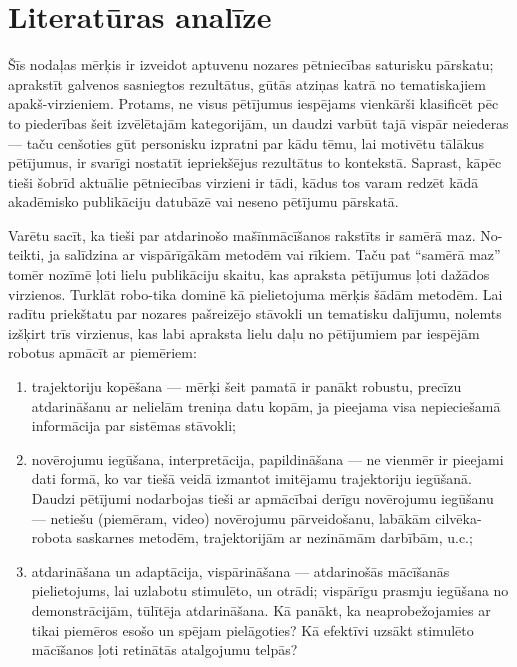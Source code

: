 \documentclass[12pt, a4paper]{article}
\numberwithin{equation}{section} %
\begin{document}
\newpage
\section{Literatūras analīze}

Šīs nodaļas mērķis ir izveidot aptuvenu nozares pētniecības saturisku pārskatu; aprakstīt galvenos sasniegtos rezultātus, gūtās atziņas katrā no tematiskajiem apakš-virzieniem. Protams, ne visus pētījumus iespējams vienkārši klasificēt pēc to piederības šeit izvēlētajām kategorijām, un daudzi varbūt tajā vispār neiederas --- taču cenšoties gūt personisku izpratni par kādu tēmu, lai motivētu tālākus pētījumus, ir svarīgi nostatīt iepriekšējus rezultātus to kontekstā. Saprast, kāpēc tieši šobrīd aktuālie pētniecības virzieni ir tādi, kādus tos varam redzēt kādā akadēmisko publikāciju datubāzē vai neseno pētījumu pārskatā.

Varētu sacīt, ka tieši par atdarinošo mašīnmācīšanos rakstīts ir samērā maz. No-teikti, ja salīdzina ar vispārīgākām metodēm vai rīkiem. Taču pat ``samērā maz'' tomēr nozīmē ļoti lielu publikāciju skaitu, kas apraksta pētījumus ļoti dažādos virzienos. Turklāt robo-tika dominē kā pielietojuma mērķis šādām metodēm. Lai radītu priekštatu par nozares pašreizējo stāvokli un tematisku dalījumu, nolemts izšķirt trīs virzienus, kas labi apraksta lielu daļu no pētījumiem par iespējām robotus apmācīt ar piemēriem:

\begin{enumerate}
    \item trajektoriju kopēšana --- mērķi šeit pamatā ir panākt robustu, precīzu atdarināšanu ar nelielām treniņa datu kopām, ja pieejama visa nepieciešamā informācija par sistēmas stāvokli;
    \item novērojumu iegūšana, interpretācija, papildināšana --- ne vienmēr ir pieejami dati formā, ko var tiešā veidā izmantot imitējamu trajektoriju iegūšanā. Daudzi pētījumi nodarbojas tieši ar apmācībai derīgu novērojumu iegūšanu --- netiešu (piemēram, video) novērojumu pārveidošanu, labākām cilvēka-robota saskarnes metodēm, trajektorijām ar nezināmām darbībām, u.c.;
    \item atdarināšana un adaptācija, vispārināšana --- atdarinošās mācīšanās pielietojums, lai uzlabotu stimulēto, un otrādi; vispārīgu prasmju iegūšana no demonstrācijām, tūlītēja atdarināšana. Kā panākt, ka neaprobežojamies ar tikai piemēros esošo un spējam pielāgoties? Kā efektīvi uzsākt stimulēto mācīšanos ļoti retinātās atalgojumu telpās?
\end{enumerate}
\end{document}
